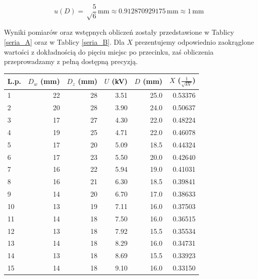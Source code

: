 \documentclass[a4paper]{article}
\begin{document}
$$u(D) = \sqrt \frac{5}{6} \, \text{mm} \approx 0.912870929175 \, \text{mm} \approx 1 \, \text{mm}$$

Wyniki pomiarów oraz wstępnych obliczeń zostały przedstawione w Tablicy \ref{seria_A} oraz w Tablicy \ref{seria_B}.
Dla $X$ prezentujemy odpowiednio zaokrąglone wartości z dokładnością do pięciu miejsc po przecinku, zaś obliczenia przeprowadzamy z pełną dostępną precyzją.

\begin{table}
\centering

\begin{tabular}{lrrrrr}
\toprule
L.p. &  $D_w$ (mm) &  $D_z$ (mm) &  $U$ (kV) &  $D$ (mm) &  $X$ ($\frac{1}{\sqrt{kV}}$) \\
\midrule
1  &          22 &          28 &      3.51 &      25.0 &                     0.53376 \\
2  &          20 &          28 &      3.90 &      24.0 &                     0.50637 \\
3  &          17 &          27 &      4.30 &      22.0 &                     0.48224 \\
4  &          19 &          25 &      4.71 &      22.0 &                     0.46078 \\
5  &          17 &          20 &      5.09 &      18.5 &                     0.44324 \\
6  &          17 &          23 &      5.50 &      20.0 &                     0.42640 \\
7  &          16 &          22 &      5.94 &      19.0 &                     0.41031 \\
8  &          16 &          21 &      6.30 &      18.5 &                     0.39841 \\
9  &          14 &          20 &      6.70 &      17.0 &                     0.38633 \\
10 &          13 &          19 &      7.11 &      16.0 &                     0.37503 \\
11 &          14 &          18 &      7.50 &      16.0 &                     0.36515 \\
12 &          13 &          18 &      7.92 &      15.5 &                     0.35534 \\
13 &          14 &          18 &      8.29 &      16.0 &                     0.34731 \\
14 &          13 &          18 &      8.69 &      15.5 &                     0.33923 \\
15 &          14 &          18 &      9.10 &      16.0 &                     0.33150 \\

\end{tabular}
\end{table}
\end{document}
